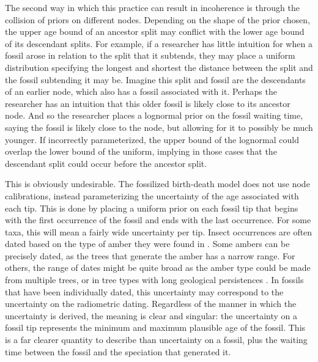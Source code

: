 \documentclass{article}
\begin{document}
The second way in which this practice can result in incoherence is through the collision of priors on different nodes.
Depending on the shape of the prior chosen,  the upper age bound of an ancestor split may conflict with the lower age bound of its descendant splits. 
For example, if a researcher has little intuition for when a fossil arose in relation to the split that it subtends, they may place a uniform distribution specifying the longest and shortest the distance between the split and the fossil subtending it may be.
Imagine this split and fossil are the descendants of an earlier node, which also has a fossil associated with it. 
Perhaps the researcher has an intuition that this older fossil is likely close to its ancestor node. 
And so the researcher places a lognormal prior on the fossil waiting time, saying the fossil is likely close to the node, but allowing for it to possibly be much younger. 
If incorrectly parameterized, the upper bound of the lognormal could overlap the lower bound of the uniform, implying in those cases that the descendant split could occur before the ancestor split.

This is obviously undesirable.
The fossilized birth-death model does not use node calibrations, instead parameterizing the uncertainty of the age associated with each tip.
This is done by placing a uniform prior on each fossil tip that begins with the first occurrence of the fossil and ends with the last occurrence. 
For some taxa, this will mean a fairly wide uncertainty per tip.
Insect occurrences are often dated based on the type of amber they were found in \citep{lapolla2013}.
Some ambers can be precisely dated, as the trees that generate the amber has a narrow range.
For others, the range of dates might be quite broad as the amber type could be made from multiple trees, or in tree types with long geological persistences \citep{poinar2000}. 
In fossils that have been individually dated, this uncertainty may correspond to the uncertainty on the radiometric dating.
Regardless of the manner in which the uncertainty is derived, the meaning is clear and singular: the uncertainty on a fossil tip represents the minimum and maximum plausible age of the fossil.
This is a far clearer quantity to describe than uncertainty on a fossil, plus the waiting time between the fossil and the speciation that generated it. 
\end{document}
